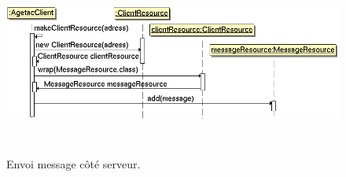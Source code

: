 \documentclass{article}
\begin{document}
\begin{figure}[htbp]
\begin{center}
\includegraphics[width=515pt, height=172pt]{doc_dev-fig013.png}
\caption{Envoi message côté serveur.}
\end{center}
\end{figure}
\end{document}
